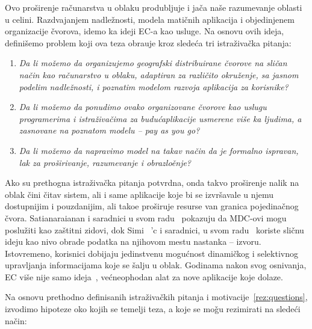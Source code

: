 Ovo pro\v sirenje ra\v cunarstva u oblaku produbljuje i ja\v ca na\v se razumevanje oblasti u celini. Razdvajanjem nadle\v znosti, modela mati\v cnih aplikacija i objedinjenem organizacije \v cvorova, idemo ka ideji EC-a kao usluge. Na osnovu ovih ideja, definišemo problem koji ova teza obra\dj uje kroz slede\'ca tri istra\v ziva\v cka pitanja:

\begin{enumerate}[start=1,label={(\bfseries \arabic*)}]\label{rez:questions}
	\item \textit{Da li mo\v zemo da organizujemo geografski distribuirane \v cvorove na sli\v can na\v cin kao ra\v cunarstvo u oblaku, adaptiran za razli\v cito okru\v zenje, sa jasnom podelim nadle\v znosti, i poznatim modelom razvoja aplikacija za korisnike?}
	\item \textit{Da li mo\v zemo da ponudimo ovako organizovane \v cvorove kao uslugu programerima i istra\v ziva\v cima za budu\'caplikacije usmerene vi\v se ka ljudima, a zasnovane na poznatom modelu -- pay as you go?}
	\item \textit{Da li mo\v zemo da napravimo model na takav na\v cin da je formalno ispravan, lak za pro\v sirivanje, razumevanje i obrazlo\v enje?}
\end{enumerate}

Ako su prethogna istra\v ziva\v cka pitanja potvrdna, onda takvo pro\v sirenje nalik na oblak \v cini \v citav sistem, ali i same aplikacije koje bi se izvr\v savale u njemu dostupnijim i pouzdanijim, ali tako\dj e pro\v siruje resurse van granica pojedina\v cnog \v cvora. Satianaraianan i saradnici u svom radu~\cite{SatyanarayananK19} pokazuju da MDC-ovi mogu poslu\v ziti kao za\v stitni zidovi, dok Simi \ 'c i saradnici, u svom radu~\cite {inproceedingsSimic1} koriste sli\v cnu ideju kao nivo obrade podatka na njihovom mestu nastanka -- izvoru. Istovremeno, korisnici dobijaju jedinstvenu mogu\'cnost dinami\v ckog i selektivnog upravljanja informacijama koje se \v salju u oblak. Godinama nakon svog osnivanja, EC vi\v se nije samo ideja~\cite {SatyanarayananK19}, ve\'cneophodan alat za nove aplikacije koje dolaze.

Na osnovu prethodno definisanih istraživačkih pitanja i motivacije~\ref {rez:questions}, izvodimo hipoteze oko kojih se temelji teza, a koje se mo\v gu rezimirati na slede\'ci na\v cin:

